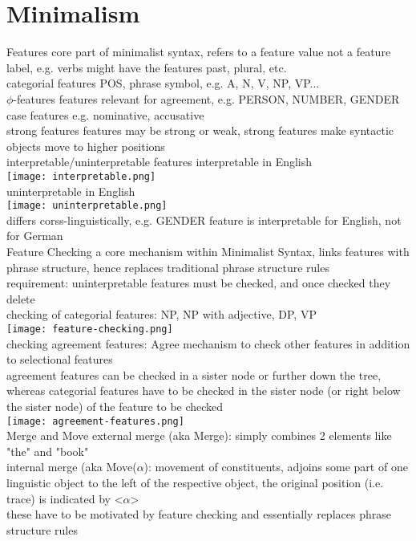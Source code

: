 \section{Minimalism}
\scriptsize{Features} {\tiny core part of minimalist syntax, refers to a feature value not a feature label, e.g. verbs might have the features past, plural, etc.
}\\
\scriptsize{categorial features} {\tiny POS, phrase symbol, e.g. A, N, V, NP, VP...
}\\
\scriptsize{$\phi$-features} {\tiny features relevant for agreement, e.g. PERSON, NUMBER, GENDER
}\\
\scriptsize{case features} {\tiny e.g. nominative, accusative}\\
\scriptsize{strong features} {\tiny features may be strong or weak, strong features make syntactic objects move to higher positions
}\\
\scriptsize{interpretable/uninterpretable features} 
{\tiny interpretable in English\\
\texttt{[image: interpretable.png]}\\
uninterpretable in English\\
\texttt{[image: uninterpretable.png]}\\
differs corss-linguistically, e.g. GENDER feature is interpretable for English, not for German
}\\
\scriptsize{Feature Checking} 
{\tiny a core mechanism within Minimalist Syntax, links features with phrase structure, hence replaces traditional phrase structure rules\\
requirement: uninterpretable features must be checked, and once checked they delete\\
checking of categorial features: NP, NP with adjective, DP, VP\\
\texttt{[image: feature-checking.png]}\\
checking agreement features: Agree mechanism to check other features in addition to selectional features\\
agreement features can be checked in a sister node or further down the tree, whereas categorial features have to be checked in the sister node (or right below the sister node) of the feature to be checked\\
\texttt{[image: agreement-features.png]}
}\\
\scriptsize{Merge and Move} 
{\tiny
external merge (aka Merge): simply combines 2 elements like "the" and "book"\\
internal merge (aka Move($\alpha$): movement of constituents, adjoins some part of one linguistic object to the left of the respective object, the original position (i.e. trace) is indicated by <$\alpha$>\\
these have to be motivated by feature checking and essentially replaces phrase structure rules
}\\
